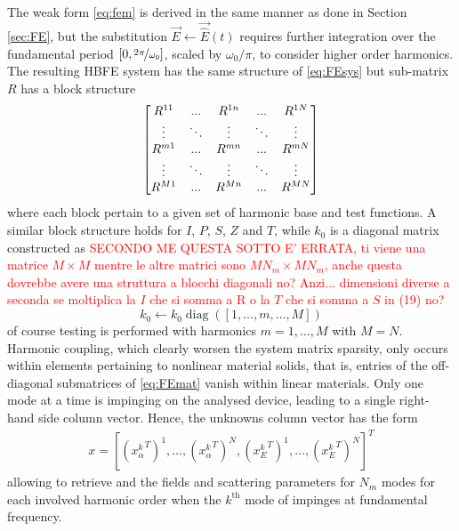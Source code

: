 \documentclass[AMA,STIX2COL]{WileyNJD-v2}
\DeclareMathOperator{\diag}{diag}
\begin{document}
The weak form \eqref{eq:fem} is derived in the same manner as done in Section \ref{sec:FE}, but the substitution $\vec{E} \leftarrow \vec{\hat{E}}(t)$ requires further integration over the fundamental period $[0,\nicefrac{2\pi}{\omega_0} ]$, scaled by $\omega_0/\pi$, to consider higher order harmonics. The resulting HBFE system has the same structure of \eqref{eq:FEsys} but sub-matrix $R$ has a block structure 
%
\begin{equation}
\label{eq:FEmat}
\thickmuskip=0mu
\medmuskip=0mu
\thinmuskip=0mu
\begin{bmatrix}
R^{11} &\ldots &R^{1n}  &\ldots &R^{1N} \\
\vdots &\ddots &\vdots  &\ddots &\vdots \\
R^{m1} &\ldots &R^{mn}  &\ldots &R^{mN} \\
\vdots &\ddots &\vdots  &\ddots &\vdots \\
R^{M1} &\ldots &R^{Mn} &\ldots &R^{MN}
\end{bmatrix}
\end{equation}
%
where each block pertain to a given set of harmonic base and test functions. A similar block structure holds for $I$, $P$, $S$, $Z$ and $T$, while $k_0$ is a diagonal matrix constructed as \textcolor{red}{SECONDO ME QUESTA SOTTO E' ERRATA, ti viene una matrice $M\times M$ mentre le altre matrici sono $MN_m\times MN_m$, anche questa dovrebbe avere una struttura a blocchi diagonali no? Anzi... dimensioni diverse a seconda se moltiplica la $I$ che si somma a R o la $T$ che si somma a $S$ in (19) no?}
%
\begin{equation}
k_0 \leftarrow k_0 \diag ({[1, \ldots, m, \ldots, M]})
\end{equation}
\noindent of course testing is performed with harmonics \mbox{$m=1,\ldots,M$} with $M=N$. Harmonic coupling, which clearly worsen the system matrix sparsity, only occurs within elements pertaining to nonlinear material solids, that is, entries of the off-diagonal submatrices of \eqref{eq:FEmat} vanish within linear materials. Only one mode at a time is impinging on the analysed device, leading to a single right-hand side column vector. Hence, the unknowns column vector has the form 
%
\begin{gather*}
x = \left[ \left({x^{k}_\alpha}^T\right)^1, \ldots,  \left({x^{k}_\alpha}^T\right)^{N},  \left({x^{k}_E}^T\right)^1, \ldots,  \left({x^{k}_E}^T\right)^N \right]^T
\end{gather*}
%
\noindent allowing to retrieve and the fields and scattering parameters for $N_m$ modes for each involved harmonic order when the $k^\text{th}$ mode of impinges at fundamental frequency.
\end{document}
